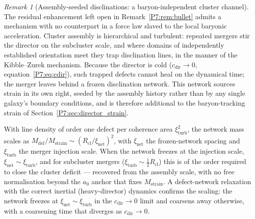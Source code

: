 \documentclass[11pt,a4paper]{article}
\theoremstyle{definition}
\theoremstyle{remark}
\newtheorem{remark}[theorem]{Remark}
\begin{document}
\begin{remark}[Assembly-seeded disclinations: a baryon-independent cluster channel]
\label{P7:rem:defect_network}
The residual enhancement left open in Remark~\ref{P7:rem:bullet} admits a
mechanism with no counterpart in a force law slaved to the local baryonic
acceleration.  Cluster assembly is hierarchical and turbulent: repeated
mergers stir the director on the subcluster scale, and where domains of
independently established orientation meet they trap disclination lines, in
the manner of the Kibble--Zurek mechanism.  Because the director is cold
($c_{\mathrm{dir}}\to0$, equation~\eqref{P7:eq:cdir}), such trapped defects
cannot heal on the dynamical time; the merger leaves behind a frozen
disclination network.  This network sources strain in its own right, seeded
by the assembly history rather than by any single galaxy's boundary
conditions, and is therefore additional to the baryon-tracking strain of
Section~\ref{P7:sec:director_strain}.

With line density of order one defect per coherence area
$\xi_{\mathrm{turb}}^2$, the network mass scales as
$M_{\mathrm{def}}/M_{\mathrm{strain}}\sim(R_{\mathrm{cl}}/\xi_{\mathrm{net}})^2$,
with $\xi_{\mathrm{net}}$ the frozen-network spacing and
$\xi_{\mathrm{turb}}$ the merger injection scale.  When the network freezes
at the injection scale, $\xi_{\mathrm{net}}\sim\xi_{\mathrm{turb}}$, and for
subcluster mergers ($\xi_{\mathrm{turb}}\sim\tfrac12 R_{\mathrm{cl}}$) this
is of the order required to close the cluster deficit --- recovered from the
assembly scale, with no free normalisation beyond the $a_0$ anchor that
fixes $M_{\mathrm{strain}}$.  A defect-network relaxation with the correct
inertial (heavy-director) dynamics confirms the scaling: the network freezes
at $\xi_{\mathrm{net}}\sim\xi_{\mathrm{turb}}$ in the $c_{\mathrm{dir}}\to0$
limit and coarsens away otherwise, with a coarsening time that diverges as
$c_{\mathrm{dir}}\to0$.


\end{remark}
\end{document}
